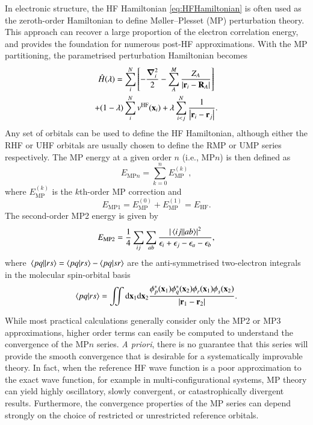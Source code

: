 \documentclass[aps,prb,reprint,noshowkeys,linenumbers,superscriptaddress]{revtex4-1}
\newcommand{\latin}[1]{#1}
\newcommand{\ie}{\latin{i.e.}}
\newcommand{\hH}{\Hat{H}}
\begin{document}
In electronic structure, the HF Hamiltonian \eqref{eq:HFHamiltonian} is often used as the zeroth-order Hamiltonian
to define M\o{}ller--Plesset (MP) perturbation theory.\cite{Moller_1934}
This approach can recover a large proportion of the electron correlation energy,\cite{Lowdin_1955a,Lowdin_1955b,Lowdin_1955c} 
and provides the foundation for numerous post-HF approximations.
With the MP partitioning, the parametrised perturbation Hamiltonian becomes
\begin{multline}\label{eq:MPHamiltonian}
    \hH(\lambda) =   
     \sum_{i}^{N} \qty[ - \frac{\grad_i^2}{2} - \sum_{A}^{M} \frac{Z_A}{\abs{\vb{r}_i-\vb{R}_A}} ]
    \\
    + (1-\lambda) \sum_{i}^{N} v^{\text{HF}}(\vb{x}_i)
    + \lambda\sum_{i<j}^{N}\frac{1}{\abs{\vb{r}_i-\vb{r}_j}}.
\end{multline}
Any set of orbitals can be used to define the HF Hamiltonian, although either the RHF or UHF orbitals are usually chosen to 
define the RMP or UMP series respectively.
The MP energy at a given order $n$ (\ie, MP$n$) is then defined as
\begin{equation}
	E_{\text{MP}n}= \sum_{k=0}^n E_{\text{MP}}^{(k)},
\end{equation}
where $E_{\text{MP}}^{(k)}$ is the $k$th-order MP correction and 
\begin{equation}
E_{\text{MP1}} =  E_{\text{MP}}^{(0)} + E_{\text{MP}}^{(1)} = E_\text{HF}.
\end{equation}
The second-order MP2 energy is given by
\begin{equation}\label{eq:EMP2}
	E_{\text{MP2}} = \frac{1}{4} \sum_{ij} \sum_{ab} \frac{\abs{\mel{ij}{}{ab}}^2}{\epsilon_i + \epsilon_j - \epsilon_a - \epsilon_b},
\end{equation}
where $\mel{pq}{}{rs} = \braket{pq}{rs} - \braket{pq}{sr}$ are the anti-symmetrised two-electron integrals
in the molecular spin-orbital basis\cite{Gill_1994}
\begin{equation}
	\braket{pq}{rs} 
    = \iint \dd\vb{x}_1\dd\vb{x}_2
    \frac{\phi^{*}_p(\vb{x}_1)\phi^{*}_q(\vb{x}_2)\phi^{\vphantom{*}}_r(\vb{x}_1)\phi^{\vphantom{*}}_s(\vb{x}_2)}%
      {\abs{\vb{r}_1 - \vb{r}_2}}.
\end{equation}

While most practical calculations generally consider only the MP2 or MP3 approximations, higher order terms can 
easily be computed to understand the convergence of the MP$n$ series.\cite{Handy_1985}
\textit{A priori}, there is no guarantee that this series will provide the smooth convergence that is desirable for a
systematically improvable theory.
In fact, when the reference HF wave function is a poor approximation to the exact wave function, 
for example in multi-configurational systems, MP theory can yield highly oscillatory, 
slowly convergent, or catastrophically divergent results.\cite{Gill_1986,Gill_1988,Handy_1985,Lepetit_1988,Leininger_2000}
Furthermore, the convergence properties of the MP series can depend strongly on the choice of restricted or
unrestricted reference orbitals.
\end{document}
